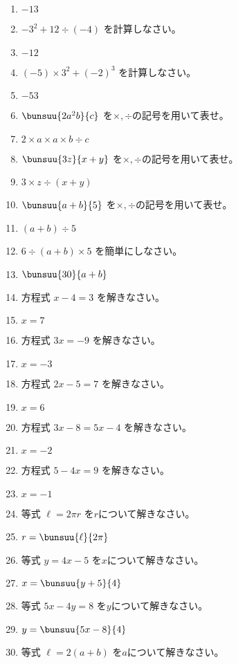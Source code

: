 \documentclass[uplatex,a4j,11pt]{jsreport}
\begin{document}
\begin{multicols}{2}
\begin{enumerate}
    \item $-13$
    \item $-3^2+12\div(-4)$ を計算しなさい。%
    \item $-12$
    \item $(-5)\times3^2+(-2)^3$ を計算しなさい。%
    \item $-53$
    \item $\bunsuu{2a^2b}{c}$ を$\times,\div$の記号を用いて表せ。%
    \item $2\times a \times a \times b \div c$
    \item $\bunsuu{3z}{x+y}$ を$\times,\div$の記号を用いて表せ。%
    \item $3\times z \div (x+y)$
    \item $\bunsuu{a+b}{5}$ を$\times,\div$の記号を用いて表せ。%
    \item $(a+b)\div5$
    \item $6\div(a+b)\times5$ を簡単にしなさい。%
    \item $\bunsuu{30}{a+b}$
    \item 方程式 $x-4=3$ を解きなさい。%
    \item $x=7$
    \item 方程式 $3x=-9$ を解きなさい。%
    \item $x=-3$
    \item 方程式 $2x-5=7$ を解きなさい。%
    \item $x=6$
    \item 方程式 $3x-8=5x-4$ を解きなさい。%
    \item $x=-2$
    \item 方程式 $5-4x=9$ を解きなさい。%
    \item $x=-1$
    \item 等式 $\ell=2\pi r$ を$r$について解きなさい。%
    \item $r=\bunsuu{\ell}{2\pi}$
    \item 等式 $y=4x-5$ を$x$について解きなさい。%
    \item $x=\bunsuu{y+5}{4}$
    \item 等式 $5x-4y=8$ を$y$について解きなさい。%
    \item $y=\bunsuu{5x-8}{4}$
    \item 等式 $\ell=2(a+b)$ を$a$について解きなさい。%

\end{enumerate}
\end{multicols}
\end{document}
